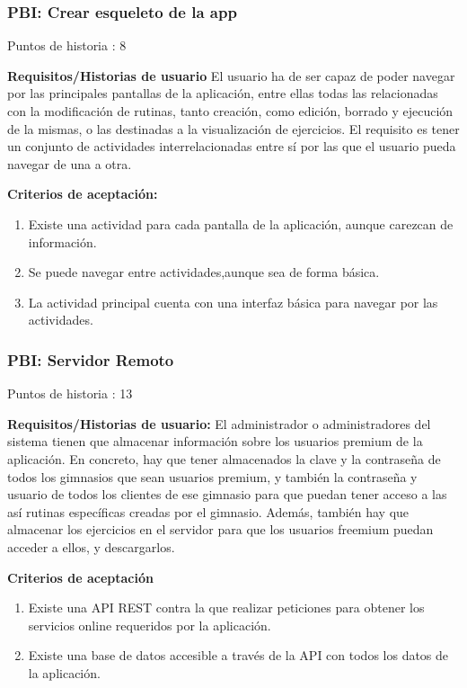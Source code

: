 \documentclass[11pt,a4paper]{report}
\begin{document}
\subsubsection{PBI: Crear esqueleto de la app}
Puntos de historia : 8
\par\textbf{Requisitos/Historias de usuario}
El usuario ha de ser capaz de poder navegar por las principales pantallas de la aplicación, entre ellas todas las relacionadas con la modificación de rutinas, tanto creación, como edición, borrado y ejecución de la mismas, o las destinadas a la visualización de ejercicios. El requisito es tener un conjunto de actividades interrelacionadas entre sí por las que el usuario pueda navegar de una a otra.
\par\textbf{Criterios de aceptación:}
\begin{enumerate}
	\item Existe una actividad para cada pantalla de la aplicación, aunque carezcan de información.
	\item Se puede navegar entre actividades,aunque sea de forma básica.
	\item La actividad principal cuenta con una interfaz básica para navegar por las actividades.
\end{enumerate}
\subsubsection{PBI: Servidor Remoto}
Puntos de historia : 13
\par\textbf{Requisitos/Historias de usuario: } El administrador o administradores del sistema tienen que almacenar información sobre los usuarios premium de la aplicación. En concreto, hay que tener almacenados la clave y la contraseña de todos los gimnasios que sean usuarios premium, y también la contraseña y usuario de todos los clientes de ese gimnasio para que puedan tener acceso a las así  rutinas específicas creadas por el gimnasio. Además, también hay que almacenar los ejercicios en el servidor para que los usuarios freemium puedan acceder a ellos, y descargarlos.
\par\textbf{Criterios de aceptación}
\begin{enumerate}
	\item Existe una API REST contra la que realizar peticiones para obtener los servicios
	online requeridos por la aplicación.
	\item Existe una base de datos accesible a través de la API con todos los datos de la
	aplicación.
\end{enumerate}
\end{document}
